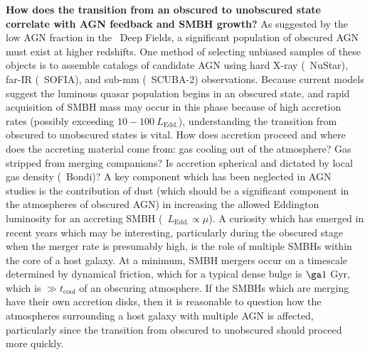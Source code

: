 \documentclass[12pt]{article}
\begin{document}
{\bf{How does the transition from an obscured to unobscured state
correlate with AGN feedback and SMBH growth?}} As suggested by the low
AGN fraction in the \chandra\ Deep Fields, a significant population of
obscured AGN must exist at higher redshifts. One method of selecting
unbiased samples of these objects is to assemble catalogs of candidate
AGN using hard X-ray (\ie\ NuStar), far-IR (\ie\ SOFIA), and sub-mm
(\ie\ SCUBA-2) observations. Because current models suggest the
luminous quasar population begins in an obscured state, and rapid
acquisition of SMBH mass may occur in this phase because of high
accretion rates (possibly exceeding $10-100~L_{\mathrm{Edd.}}$),
understanding the transition from obscured to unobscured states is
vital. How does accretion proceed and where does the accreting
material come from: gas cooling out of the atmosphere? Gas stripped
from merging companions? Is accretion spherical and dictated by local
gas density (\eg\ Bondi)?  A key component which has been neglected in
AGN studies is the contribution of dust (which should be a significant
component in the atmospheres of obscured AGN) in increasing the
allowed Eddington luminosity for an accreting SMBH (\ie\
$L_{\mathrm{Edd.}} \propto \mu$). A curiosity which has emerged in
recent years which may be interesting, particularly during the
obscured stage when the merger rate is presumably high, is the role of
multiple SMBHs within the core of a host galaxy. At a minimum, SMBH
mergers occur on a timescale determined by dynamical friction, which
for a typical dense bulge is $\ga 1$ Gyr, which is $\gg
t_{\mathrm{cool}}$ of an obscuring atmosphere. If the SMBHs which are
merging have their own accretion disks, then it is reasonable to
question how the atmospheres surrounding a host galaxy with multiple
AGN is affected, particularly since the transition from obscured to
unobscured should proceed more quickly.

\scriptsize


 
\end{document}
